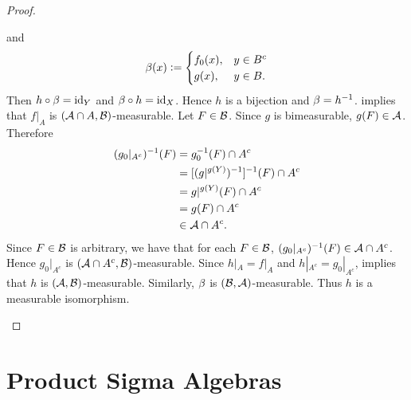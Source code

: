 \documentclass{book}
\begin{document}
\begin{proof}
\begin{enumerate}
\[			\]
			and  
			\[
			\beta(x) \vcentcolon= 
			\begin{cases}
				f_0(x), & y \in B^c \\
				g(x),  & y \in B.
			\end{cases}
			\]
			Then $h \circ \beta = \operatorname{id}_Y$ and $\beta \circ h = \operatorname{id}_X$. Hence $h$ is a bijection and $\beta = h^{-1}$.  implies that $f|_A$ is $(\mathcal{A} \cap A, \mathcal{B})$-measurable. Let $F \in \mathcal{B}$. Since $g$ is bimeasurable, $g(F) \in \mathcal{A}$. Therefore 
			\begin{align*}
				(g_0|_{A^c})^{-1}(F)  
				& = g_0^{-1}(F) \cap A^c \\
				& = [(g|^{g(Y)})^{-1}]^{-1}(F) \cap A^c \\
				& = g|^{g(Y)}(F) \cap A^c \\
				& = g(F) \cap A^c \\
				& \in \mathcal{A} \cap A^c. 
			\end{align*}
			Since $F \in \mathcal{B}$ is arbitrary, we have that for each $F \in \mathcal{B}$, $(g_0|_{A^c})^{-1}(F) \in \mathcal{A} \cap A^c$. Hence $g_0|_{A^c}$ is $(\mathcal{A} \cap A^c, \mathcal{B})$-measurable. Since $h|_A = f|_A$ and $h|_{A^c} = g_0|_{A^c}$,  implies that $h$ is $(\mathcal{A}, \mathcal{B})$-measurable. Similarly, $\beta$ is $(\mathcal{B}, \mathcal{A})$-measurable. Thus $h$ is a measurable isomorphism.
		\end{enumerate}
	\end{proof}











































	\newpage
	\section{Product Sigma Algebras}
	
\end{document}

